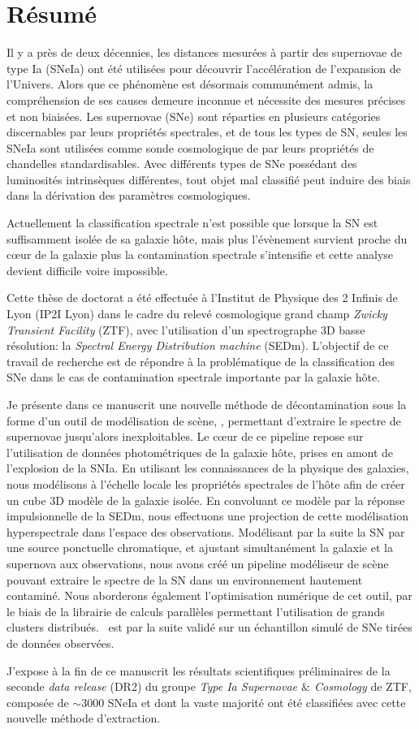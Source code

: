 \documentclass[../main/main.tex]{subfiles}
\begin{document}
\chapter*{Résumé}
\label{chap:resume}
\vspace{2cm}
Il y a près de deux décennies, les distances mesurées à partir des
supernovae de type Ia (SNeIa) ont été utilisées pour découvrir
l’accélération de l’expansion de l’Univers. Alors que ce phénomène est
désormais communément admis, la compréhension de ses causes demeure
inconnue et nécessite des mesures précises et non biaisées.
Les supernovae (SNe) sont réparties en plusieurs catégories discernables
par leurs propriétés spectrales, et de tous les types de SN, seules les
SNeIa sont utilisées comme sonde cosmologique de par leurs propriétés de
chandelles standardisables.
Avec différents types de SNe possédant des luminosités intrinsèques
différentes, tout objet mal classifié peut induire des biais dans la
dérivation des paramètres cosmologiques.

Actuellement la classification spectrale n'est possible que lorsque la SN est suffisamment
isolée de sa galaxie hôte, mais plus l'évènement survient proche du cœur
de la galaxie plus la contamination spectrale s'intensifie et cette analyse
devient difficile voire impossible.

Cette thèse de doctorat a été effectuée à l’Institut de Physique des 2
Infinis de Lyon (IP2I Lyon) dans le cadre du relevé cosmologique grand champ \textit{Zwicky
Transient Facility} (ZTF), avec l'utilisation d’un spectrographe 3D
basse résolution: la \textit{Spectral Energy Distribution machine}
(SEDm). L’objectif de ce travail de recherche est de répondre à la
problématique de la classification des SNe dans le cas de
contamination spectrale importante par la galaxie hôte. 

Je présente dans ce manuscrit une nouvelle
méthode de décontamination sous la forme d'un outil de modélisation de
scène, \hypergal, permettant d'extraire le spectre de supernovae jusqu'alors
inexploitables. Le cœur de ce pipeline repose sur l’utilisation de
données photométriques de la galaxie hôte, prises en amont de
l’explosion de la SNIa. En utilisant les connaissances de la physique
des galaxies, nous modélisons à l’échelle locale les propriétés
spectrales de l'hôte afin de créer un cube 3D modèle de la galaxie
isolée. En convoluant ce modèle par la réponse impulsionnelle de la
SEDm, nous effectuons une projection de cette modélisation
hyperspectrale dans l'espace des observations. Modélisant par la suite
la SN par une source ponctuelle chromatique, et ajustant simultanément la
galaxie et la supernova aux observations, nous avons créé un pipeline
modéliseur de scène pouvant extraire le spectre de la SN dans un
environnement hautement contaminé. Nous aborderons également
l'optimisation numérique de cet outil, par le biais de la librairie de
calculs parallèles  permettant l'utilisation de grands clusters
distribués. \hypergal\ est par la suite validé sur un
échantillon simulé de SNe tirées de données observées.

J’expose à la fin de ce manuscrit les résultats scientifiques
préliminaires de la seconde \textit{data release} (DR2) du groupe \textit{Type Ia
Supernovae $\&$ Cosmology} de ZTF, composée de $\sim3000$ SNeIa et dont la vaste majorité ont
été classifiées avec cette nouvelle méthode d’extraction.
\end{document}
